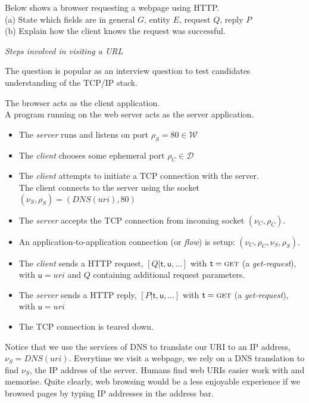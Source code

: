 \frmrule 

\begin{example}
Below shows a browser requesting a webpage using HTTP. \\
(a) State which fields are in general $G$, entity $E$, request $Q$, reply $P$\\
(b) Explain how the client knows the request was successful. 
\end{example}

\frmrule 

\textit{Steps involved in visiting a URL}

The question is popular as an interview question 
to test candidates understanding of the TCP/IP stack. 

The browser acts as the client application. \\
A program running on the web server acts as the server application. 
\begin{itemize}[nosep]
\renewcommand{\labelitemi}{$\Box$}
\item The \textit{server} runs and listens on port $\rho_S = 80 \in \mathcal{W}$
\item The \textit{client} chooses some ephemeral port $\rho_C \in \mathcal{D}$
\item The \textit{client} attempts to initiate a TCP connection with the server. \\
The client connects to the server using the socket $(\nu_S,\rho_S) = (DNS(uri),80)$ 
\item The \textit{server} accepts the TCP connection from incoming socket $(\nu_C,\rho_C)$. 
\item An application-to-application connection (or \textit{flow}) is setup: $(\nu_C, \rho_C, \nu_S, \rho_S)$.
\item The \textit{client} sends a HTTP request, $[Q | \mathsf{t},\mathsf{u}, ...]$
with $\mathsf{t} = \textsc{get}$ (a \textit{get-request}), 
with $\mathsf{u} = uri$ and $Q$ containing additional request parameters. 
\item The \textit{server} sends a HTTP reply, $[P | \mathsf{t},\mathsf{u}, ...]$
with $\mathsf{t} = \textsc{get}$ (a \textit{get-request}), 
with $\mathsf{u} = uri$
\item The TCP connection is teared down.
\end{itemize}

Notice that we use the services of DNS to translate our URI to an IP address, 
$\nu_S = DNS(uri)$. Everytime we visit a webpage, we rely on a DNS translation 
to find $\nu_S$, the IP address of the server. Humans find web URIs easier 
work with and memorise. Quite clearly, web browsing 
would be a less enjoyable experience if we browsed pages by typing IP addresses 
in the address bar.


